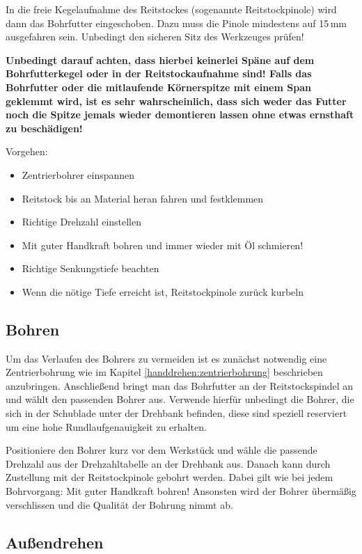 \documentclass{\basedir/fablab-document}
\begin{document}
In die freie Kegelaufnahme des Reitstockes (sogenannte Reitstockpinole) wird dann das Bohrfutter eingeschoben.
Dazu muss die Pinole mindestens auf 15\,mm ausgefahren sein.
Unbedingt den sicheren Sitz des Werkzeuges prüfen!

\textbf{Unbedingt darauf achten, dass hierbei keinerlei Späne auf dem Bohrfutterkegel oder in der Reitstockaufnahme sind! Falls das Bohrfutter oder die mitlaufende Körnerspitze mit einem Span geklemmt wird, ist es sehr wahrscheinlich, dass sich weder das Futter noch die Spitze jemals wieder demontieren lassen ohne etwas ernsthaft zu beschädigen!}

Vorgehen:
\begin{itemize}
\item Zentrierbohrer einspannen
\item Reitstock bis an Material heran fahren und festklemmen
\item Richtige Drehzahl einstellen
\item Mit guter Handkraft bohren und immer wieder mit Öl schmieren!
\item Richtige Senkungstiefe beachten
\item Wenn die nötige Tiefe erreicht ist, Reitstockpinole zurück kurbeln

\end{itemize}

\subsection{Bohren}

Um das Verlaufen des Bohrers zu vermeiden ist es zunächst notwendig eine Zentrierbohrung wie im Kapitel \ref{handdrehen:zentrierbohrung} beschrieben anzubringen.
Anschließend bringt man das Bohrfutter an der Reitstockspindel an und wählt den passenden Bohrer aus.
Verwende hierfür unbedingt die Bohrer, die sich in der Schublade unter der Drehbank befinden, diese sind speziell reserviert um eine hohe Rundlaufgenauigkeit zu erhalten.

Positioniere den Bohrer kurz vor dem Werkstück und wähle die passende Drehzahl aus der Drehzahltabelle an der Drehbank aus.
Danach kann durch Zustellung mit der Reitstockpinole gebohrt werden.
Dabei gilt wie bei jedem Bohrvorgang: Mit guter Handkraft bohren!
Ansonsten wird der Bohrer übermäßig verschlissen und die Qualität der Bohrung nimmt ab.

\subsection{Außendrehen} 
\end{document}
